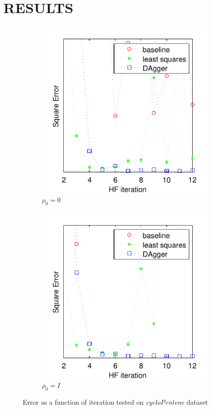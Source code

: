 \documentclass[twoside,11pt]{article}
\begin{document}
\section{RESULTS}



\begin{figure}[h!]
\centering
\begin{subfigure}{.5\textwidth}
  \centering
  \includegraphics[scale=0.7]{cycloPen_pzero_test_12iter.pdf}
  \caption{$\rho_0 = 0$}
  \label{fig:cycloPen0}
\end{subfigure}%
\begin{subfigure}{.5\textwidth}
  \centering
  \includegraphics[scale=0.7]{cycloPen_peye_test_12iter.pdf}
  \caption{$\rho_0 = I$}
  \label{fig:cycloPenI}
\end{subfigure}
\caption{Error as a function of iteration tested on \textit{cycloPentene} dataset}
\label{fig:testcycloPen}
\end{figure}
\end{document}
